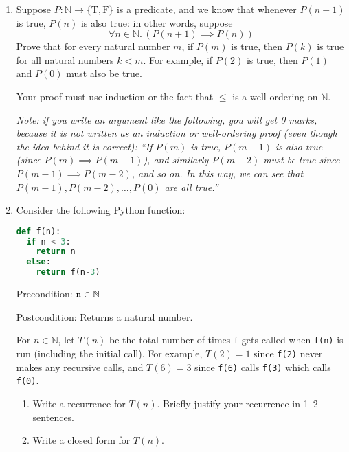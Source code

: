 \documentclass{article}
\newcommand{\C}[1]{\textup{\texttt{#1}}}
\newcommand\FALSE{{\mathrm{F}}}
\newcommand\TRUE{{\mathrm{T}}}
\newcommand\IMPLIES{\implies}
\newcommand\nats{{\mathbb{N}}}
\newcommand{\worthMarks}[1]{[#1 marks] \par}
\begin{document}
\begin{enumerate}
\item \worthMarks{10}

Suppose 
\( P : \nats \to \{ \TRUE, \FALSE \} \) 
is a predicate, and we
know that whenever \( P( n+1 ) \) is true, \( P( n ) \) is also true: in other
words, suppose
\[ \forall n \in \nats .\, (P( n+1 ) \allowbreak \IMPLIES P( n )) \] Prove that
for every natural number \( m \), if \( P( m ) \) is true, then \( P( k ) \) is
true for all natural numbers \( k < m \). For example, if \( P(2) \) is true,
then \( P(1) \) and \( P(0) \) must also be true.

Your proof must use induction or the fact that \( \le \) is a well-ordering on
\( \nats \).

\textit{Note: if you write an argument like the following, you will get 0
  marks, because it is not written as an induction or well-ordering proof (even
  though the idea behind it is correct): ``If \( P(m) \) is true,
  \( P( m-1 ) \) is also true (since \( P( m ) \IMPLIES P( m-1 ) \)), and
  similarly \( P( m-2 ) \) must be true since \( P( m-1 ) \IMPLIES P( m-2 ) \),
  and so on. In this way, we can see that
  \( P( m-1 ), P( m-2 ), \dotsc, P( 0 ) \) are all true.''}

\item \worthMarks{9}

Consider the following Python function:

\begin{lstlisting}[language=Python]
def f(n):
  if n < 3:
    return n
  else:
    return f(n-3)
\end{lstlisting}

\noindent Precondition: \( \C{n} \in \nats \)

\noindent Postcondition: Returns a natural number.

For \( n \in \nats \), let \( T( n ) \) be the total number of times \C{f} gets
called when \C{f(n)} is run (including the initial call). For example,
\( T(2) = 1 \) since \C{f(2)} never makes any recursive calls, and
\( T(6) = 3 \) since \C{f(6)} calls \C{f(3)} which calls \C{f(0)}.

\begin{enumerate}[label=(\alph*)]
\item \label{q:recurrence} Write a recurrence for \( T(n) \). Briefly
justify your recurrence in 1--2 sentences.

\item \label{q:closed} Write a closed form for \( T(n) \).


\end{enumerate}
\end{enumerate}
\end{document}
